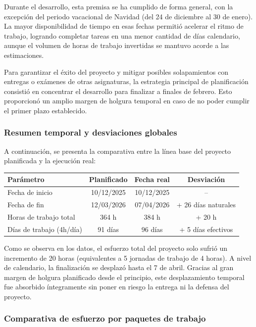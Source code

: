  Durante el desarrollo, esta premisa se ha cumplido de forma general, con la excepción
  del periodo vacacional de Navidad (del 24 de diciembre al 30 de enero). La mayor disponibilidad de tiempo en esas fechas permitió acelerar el ritmo de trabajo, logrando completar tareas en una menor cantidad de días calendario, aunque el volumen de horas de trabajo invertidas se mantuvo acorde a las estimaciones.

Para garantizar el éxito del proyecto y mitigar posibles solapamientos con entregas o exámenes de otras asignaturas, la estrategia principal de planificación consistió en concentrar el desarrollo para finalizar a finales de febrero. Esto proporcionó un amplio margen de holgura temporal en caso de no poder cumplir el primer plazo establecido.

\subsubsection{Resumen temporal y desviaciones globales}

A continuación, se presenta la comparativa entre la línea base del proyecto planificada y la ejecución real:

\begin{center}
\small
\begin{tabularx}{\textwidth}{Xccc}
\toprule
\textbf{Parámetro} & \textbf{Planificado} & \textbf{Fecha real} & \textbf{Desviación} \\
\midrule
Fecha de inicio & 10/12/2025 & 10/12/2025 & -- \\
Fecha de fin & 12/03/2026 & 07/04/2026 & + 26 días naturales \\
Horas de trabajo total & 364 h & 384 h & + 20 h \\
Días de trabajo (4h/día) & 91 días & 96 días & + 5 días efectivos \\
\bottomrule
\end{tabularx}
\end{center}

Como se observa en los datos, el esfuerzo total del proyecto solo sufrió un incremento de 20 horas (equivalentes a 5 jornadas de trabajo de 4 horas). A nivel de calendario, la finalización se desplazó hasta el 7 de abril. Gracias al gran margen de holgura planificado desde el principio, este desplazamiento temporal fue absorbido íntegramente sin poner en riesgo la entrega ni la defensa del proyecto. 
\subsubsection{Comparativa de esfuerzo por paquetes de trabajo}


